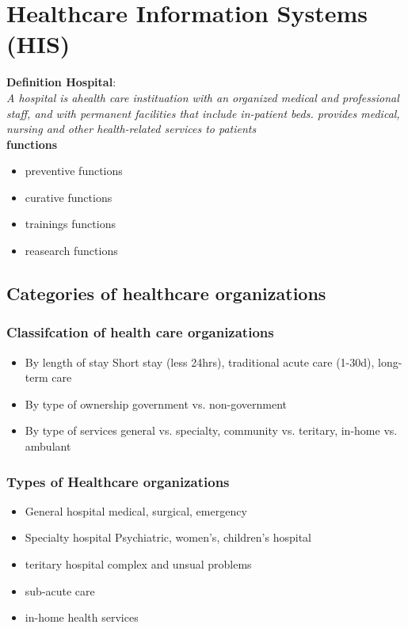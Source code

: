 \documentclass{report}
\theoremstyle{definition}
\theoremstyle{example}
\begin{document}
\chapter{Healthcare Information Systems (HIS)}

\textbf{Definition Hospital}:\\
\textit{A hospital is ahealth care instituation with an organized medical and professional staff, and with permanent facilities
that include in-patient beds. provides medical, nursing and other health-related services to patients}\\
\textbf{functions}
\begin{itemize}
   \item preventive functions
   \item curative functions
   \item trainings functions
   \item reasearch functions
\end{itemize}

\section{Categories of healthcare organizations}

   \subsection{Classifcation of health care organizations}
   \begin{itemize}
      \item By length of stay
      \subitem Short stay (less 24hrs), traditional acute care (1-30d), long-term care 
      \item By type of ownership
      \subitem government vs. non-government 
      \item By type of services
      \subitem general vs. specialty, community vs. teritary, in-home vs. ambulant 
   \end{itemize}

   \subsection{Types of Healthcare organizations}
   \begin{itemize}
      \item General hospital
      \subitem medical, surgical, emergency 
      \item Specialty hospital
      \subitem Psychiatric, women's, children's hospital 
      \item teritary hospital
      \subitem complex and unsual problems 
      \item sub-acute care
      \item in-home health services
   \end{itemize}
\end{document}
